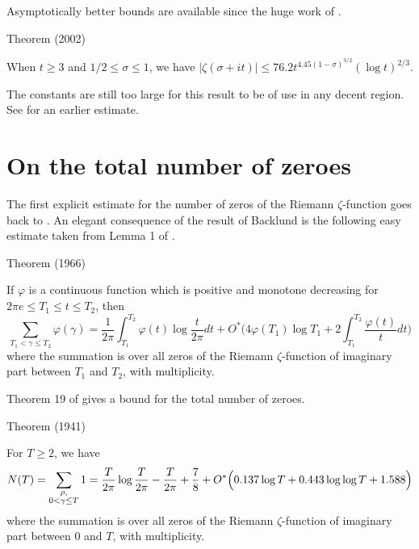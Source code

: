 Asymptotically better bounds are available since the huge work of
\cite{Ford*02}.
\par 
\begin{thm}{Theorem (2002)}

  When $t\ge 3$ and $1/2\le \sigma\le 1$, we have $|\zeta(\sigma+it)|\le 76.2
  t^{4.45(1-\sigma)^{3/2} } (\log t)^{2/3}$.
\end{thm}

The constants are still too large for this result to be of use in any decent
region. See \cite{Kulas*94} for an
earlier estimate.





\par 
\section{On the total number of zeroes}


The first explicit estimate for the number of zeros of the Riemann
$\zeta$-function goes back to
\cite{Backlund*14}.
An elegant consequence of the result of Backlund is the following easy
estimate taken from Lemma 1 of
\cite{Lehman*66a}.

\begin{thm}{Theorem (1966)}

If $\varphi$ is a continuous function which is positive and monotone
decreasing for $2\pi e\le T_1\le t\le T_2$, then
$$
\sum_{T_1 < \gamma\le T_2} \varphi(\gamma)
            =\frac{1}{2\pi}\int_{T_1}^{T_2}\varphi(t)\log\frac{t}{2\pi}dt
            +O^*\biggl(4\varphi(T_1)\log
            T_1+2\int_{T_1}^{T_2}\frac{\varphi(t)}{t}
            dt\biggr)
            $$
             where the summation is over all zeros of the Riemann
            $\zeta$-function of
            imaginary part between $T_1$ and $T_2$, with multiplicity.
\end{thm}


Theorem 19 of
\cite{Rosser*41}
gives a bound for the total number of zeroes.

\begin{thm}{Theorem (1941)}

For $T\ge2$, we have
$$
N(T)=\sum_{\substack{\rho,\\ 0 < \gamma\le T}} 1=
            \frac{T}{2\pi}\log\frac{T}{2\pi}-\frac{T}{2\pi}+\frac{7}{8}
            +O^*\Bigl(0.137\log T+0.443\log\log T+1.588
            \Bigr)
            $$
            where the summation is over all zeros of the Riemann
            $\zeta$-function of
            imaginary part between 0 and $T$, with multiplicity.
\end{thm}


